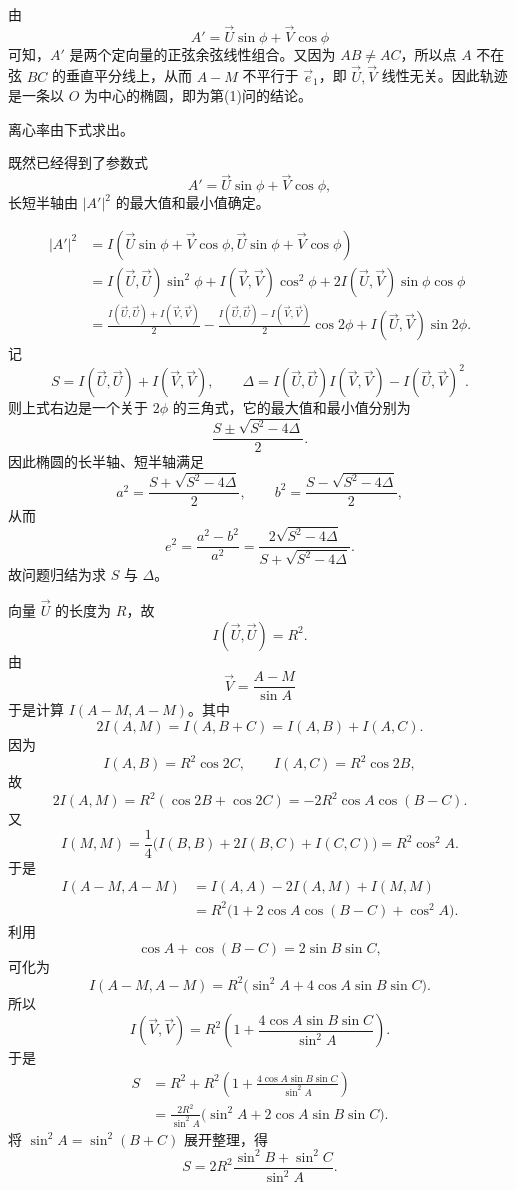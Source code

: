 \begin{solution}
由
\[
A'=\vec U\sin\phi+\vec V\cos\phi
\]
可知，$A'$ 是两个定向量的正弦余弦线性组合。又因为 $AB\ne AC$，所以点 $A$ 不在弦 $BC$ 的垂直平分线上，从而 $A-M$ 不平行于 $\vec e_1$，即 $\vec U,\vec V$ 线性无关。因此轨迹是一条以 $O$ 为中心的椭圆，即为第(1)问的结论。

离心率由下式求出。

既然已经得到了参数式
\[
A'=\vec U\sin\phi+\vec V\cos\phi,
\]
长短半轴由 $|A'|^2$ 的最大值和最小值确定。

\begin{align*}
|A'|^2
&=I(\vec U\sin\phi+\vec V\cos\phi,\vec U\sin\phi+\vec V\cos\phi)\\
&=I(\vec U,\vec U)\sin^2\phi+I(\vec V,\vec V)\cos^2\phi+2I(\vec U,\vec V)\sin\phi\cos\phi\\
&=\frac{I(\vec U,\vec U)+I(\vec V,\vec V)}{2}
-\frac{I(\vec U,\vec U)-I(\vec V,\vec V)}{2}\cos2\phi
+I(\vec U,\vec V)\sin2\phi.
\end{align*}
记
\[
S=I(\vec U,\vec U)+I(\vec V,\vec V),\qquad
\Delta=I(\vec U,\vec U)I(\vec V,\vec V)-I(\vec U,\vec V)^2.
\]
则上式右边是一个关于 $2\phi$ 的三角式，它的最大值和最小值分别为
\[
\frac{S\pm\sqrt{S^2-4\Delta}}{2}.
\]
因此椭圆的长半轴、短半轴满足
\[
a^2=\frac{S+\sqrt{S^2-4\Delta}}{2},\qquad
b^2=\frac{S-\sqrt{S^2-4\Delta}}{2},
\]
从而
\[
e^2=\frac{a^2-b^2}{a^2}
=\frac{2\sqrt{S^2-4\Delta}}{S+\sqrt{S^2-4\Delta}}.
\]
故问题归结为求 $S$ 与 $\Delta$。

向量 $\vec U$ 的长度为 $R$，故
\[
I(\vec U,\vec U)=R^2.
\]
由
\[
\vec V=\frac{A-M}{\sin A}
\]
于是计算 $I(A-M,A-M)$。其中
\[
2I(A,M)=I(A,B+C)=I(A,B)+I(A,C).
\]
因为
\[
I(A,B)=R^2\cos2C,\qquad I(A,C)=R^2\cos2B,
\]
故
\[
2I(A,M)=R^2(\cos2B+\cos2C)=-2R^2\cos A\cos(B-C).
\]
又
\[
I(M,M)=\frac14\bigl(I(B,B)+2I(B,C)+I(C,C)\bigr)=R^2\cos^2A.
\]
于是
\begin{align*}
I(A-M,A-M)
&=I(A,A)-2I(A,M)+I(M,M)\\
&=R^2\bigl(1+2\cos A\cos(B-C)+\cos^2A\bigr).
\end{align*}
利用
\[
\cos A+\cos(B-C)=2\sin B\sin C,
\]
可化为
\[
I(A-M,A-M)=R^2\bigl(\sin^2A+4\cos A\sin B\sin C\bigr).
\]
所以
\[
I(\vec V,\vec V)=R^2\left(1+\frac{4\cos A\sin B\sin C}{\sin^2A}\right).
\]
于是
\begin{align*}
S
&=R^2+R^2\left(1+\frac{4\cos A\sin B\sin C}{\sin^2A}\right)\\
&=\frac{2R^2}{\sin^2A}\bigl(\sin^2A+2\cos A\sin B\sin C\bigr).
\end{align*}
将 $\sin^2A=\sin^2(B+C)$ 展开整理，得
\[
S=2R^2\frac{\sin^2B+\sin^2C}{\sin^2A}.
\]


\end{solution}
